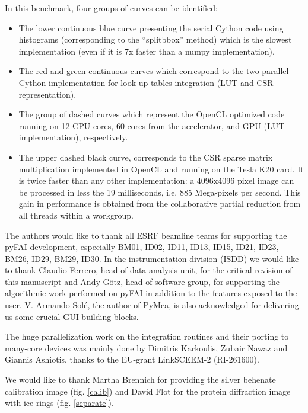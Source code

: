 \documentclass[preprint]{iucr}
\begin{document}
In this benchmark, four groups of curves can be identified:
\begin{itemize}
  \item The lower continuous blue curve presenting the serial Cython code using
  histograms (corresponding to the ``splitbbox'' method) which is the slowest
  implementation (even if it is 7x faster than a numpy implementation).
  \item The red and green continuous curves which correspond to the two parallel
  Cython implementation for look-up tables integration (LUT and CSR
  representation).
  \item The group of dashed curves which represent the OpenCL optimized code
  running on 12 CPU cores, 60 cores from the accelerator, and GPU (LUT
  implementation), respectively.
  \item The upper dashed black curve, corresponds to the CSR sparse matrix
  multiplication implemented in OpenCL and running on the Tesla K20 card.
  It is twice faster than any other implementation: a 4096x4096 pixel
  image can be processed in less the 19 milliseconds, i.e. 885 Mega-pixels
  per second.
  This gain in performance is obtained from the collaborative
  partial reduction from all threads within a workgroup.
\end{itemize}



The authors would like to thank all ESRF beamline teams for supporting the
pyFAI development, especially BM01, ID02, ID11, ID13, ID15, ID21, ID23, BM26,
ID29, BM29, ID30.
In the instrumentation division (ISDD) we would like to thank Claudio
Ferrero, head of data analysis unit, for the critical revision of this
manuscript and Andy G\"otz, head of software group, for supporting the
algorithmic work performed on pyFAI in addition to the features exposed to the
user.
V. Armando Solé, the author of PyMca, is also acknowledged for delivering us
some crucial GUI building blocks.

The huge parallelization work on the integration routines and their porting to
many-core devices was mainly done by Dimitris Karkoulis, Zubair Nawaz and Giannis Ashiotis,
thanks to the EU-grant LinkSCEEM-2 (RI-261600).

We would like to thank Martha Brennich for providing the silver behenate
calibration image (fig. \ref{calib}) and David Flot for the protein diffraction
image with ice-rings (fig. \ref{separate}).
\end{document}
